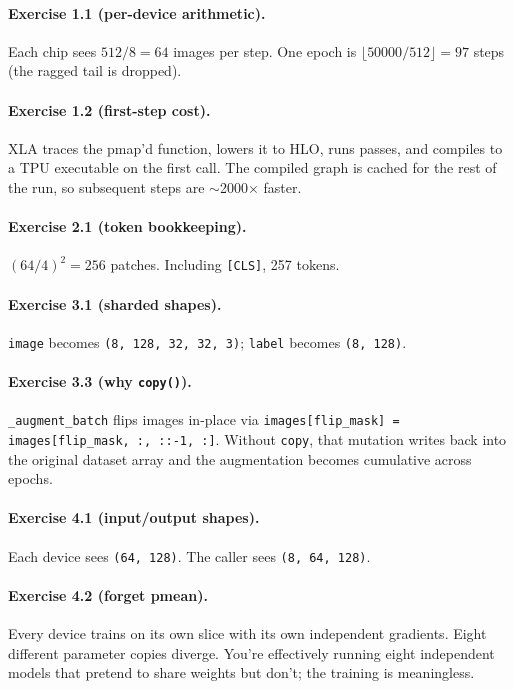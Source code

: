 \documentclass[11pt,a4paper]{article}
\newcounter{lab}
\begin{document}
\paragraph{Exercise 1.1 (per-device arithmetic).}
Each chip sees $512 / 8 = 64$ images per step. One epoch is
$\lfloor 50000 / 512 \rfloor = 97$ steps (the ragged tail is dropped).

\paragraph{Exercise 1.2 (first-step cost).}
XLA traces the pmap'd function, lowers it to HLO, runs passes, and compiles to a TPU
executable on the first call. The compiled graph is cached for the rest of the run, so
subsequent steps are $\sim$2000$\times$ faster.

\paragraph{Exercise 2.1 (token bookkeeping).}
$(64/4)^2 = 256$ patches. Including \texttt{[CLS]}, 257 tokens.

\paragraph{Exercise 3.1 (sharded shapes).}
\texttt{image} becomes \texttt{(8, 128, 32, 32, 3)};
\texttt{label} becomes \texttt{(8, 128)}.

\paragraph{Exercise 3.3 (why \texttt{copy()}).}
\texttt{\_augment\_batch} flips images in-place via \texttt{images[flip\_mask] = images[flip\_mask, :, ::-1, :]}.
Without \texttt{copy}, that mutation writes back into the original dataset array and the
augmentation becomes cumulative across epochs.

\paragraph{Exercise 4.1 (input/output shapes).}
Each device sees \texttt{(64, 128)}. The caller sees \texttt{(8, 64, 128)}.

\paragraph{Exercise 4.2 (forget pmean).}
Every device trains on its own slice with its own independent gradients. Eight different
parameter copies diverge. You're effectively running eight independent models that pretend
to share weights but don't; the training is meaningless.
\end{document}

